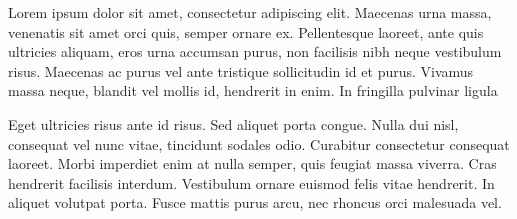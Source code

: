 Lorem ipsum dolor sit amet, consectetur adipiscing elit. Maecenas urna massa, venenatis sit amet orci quis, semper ornare ex. Pellentesque laoreet, ante quis ultricies aliquam, eros urna accumsan purus, non facilisis nibh neque vestibulum risus. Maecenas ac purus vel ante tristique sollicitudin id et purus. Vivamus massa neque, blandit vel mollis id, hendrerit in enim. In fringilla pulvinar ligula

Eget ultricies risus ante id risus. Sed aliquet porta congue. Nulla dui nisl, consequat vel nunc vitae, tincidunt sodales odio. Curabitur consectetur consequat laoreet. Morbi imperdiet enim at nulla semper, quis feugiat massa viverra. Cras hendrerit facilisis interdum. Vestibulum ornare euismod felis vitae hendrerit. In aliquet volutpat porta. Fusce mattis purus arcu, nec rhoncus orci malesuada vel. 